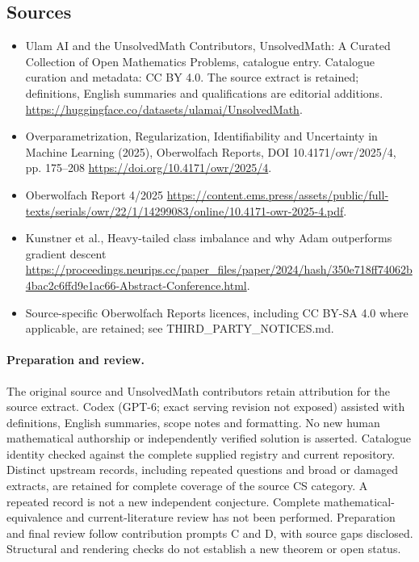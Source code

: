 \documentclass[11pt]{article}
\begin{document}
\subsection{Sources}
\begin{itemize}
\item[S1] Ulam AI and the UnsolvedMath Contributors, UnsolvedMath: A Curated Collection of Open Mathematics Problems, catalogue entry. Catalogue curation and metadata: CC BY 4.0. The source extract is retained; definitions, English summaries and qualifications are editorial additions.
\url{https://huggingface.co/datasets/ulamai/UnsolvedMath}.
\item[S2] Overparametrization, Regularization, Identifiability and Uncertainty in Machine Learning (2025), Oberwolfach Reports, DOI 10.4171/owr/2025/4, pp. 175--208
\url{https://doi.org/10.4171/owr/2025/4}.
\item[S3] Oberwolfach Report 4/2025
\url{https://content.ems.press/assets/public/full-texts/serials/owr/22/1/14299083/online/10.4171-owr-2025-4.pdf}.
\item[S4] Kunstner et al., Heavy-tailed class imbalance and why Adam outperforms gradient descent
\url{https://proceedings.neurips.cc/paper_files/paper/2024/hash/350e718ff74062b4bac2c6ffd9e1ac66-Abstract-Conference.html}.
\item Source-specific Oberwolfach Reports licences, including CC BY-SA 4.0 where applicable, are retained; see THIRD\_PARTY\_NOTICES.md.
\end{itemize}
\paragraph{Preparation and review.}
The original source and UnsolvedMath contributors retain attribution for the source extract. Codex (GPT-6; exact serving revision not exposed) assisted with definitions, English summaries, scope notes and formatting. No new human mathematical authorship or independently verified solution is asserted. Catalogue identity checked against the complete supplied registry and current repository. Distinct upstream records, including repeated questions and broad or damaged extracts, are retained for complete coverage of the source CS category. A repeated record is not a new independent conjecture. Complete mathematical-equivalence and current-literature review has not been performed. Preparation and final review follow contribution prompts C and D, with source gaps disclosed. Structural and rendering checks do not establish a new theorem or open status.
\label{end:statement}
\end{document}

